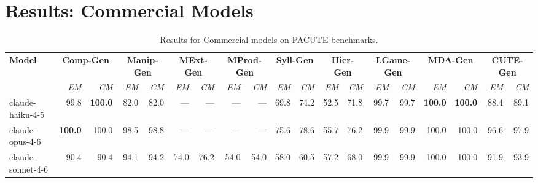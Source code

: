 \documentclass{article}
\begin{document}
\section*{Results: Commercial Models}

\begin{table}[htbp]
\centering
\caption{Results for Commercial models on PACUTE benchmarks.}
\label{tab:results-commercial}
\begin{threeparttable}
\begin{adjustbox}{max width=\textwidth}
\begin{tabular}{lrrrrrrrrrrrrrrrrrr}
\toprule
\textbf{Model} & \multicolumn{2}{c}{\textbf{Comp-Gen}} & \multicolumn{2}{c}{\textbf{Manip-Gen}} & \multicolumn{2}{c}{\textbf{MExt-Gen}} & \multicolumn{2}{c}{\textbf{MProd-Gen}} & \multicolumn{2}{c}{\textbf{Syll-Gen}} & \multicolumn{2}{c}{\textbf{Hier-Gen}} & \multicolumn{2}{c}{\textbf{LGame-Gen}} & \multicolumn{2}{c}{\textbf{MDA-Gen}} & \multicolumn{2}{c}{\textbf{CUTE-Gen}} \\
\cmidrule(lr){2-3}\cmidrule(lr){4-5}\cmidrule(lr){6-7}\cmidrule(lr){8-9}\cmidrule(lr){10-11}\cmidrule(lr){12-13}\cmidrule(lr){14-15}\cmidrule(lr){16-17}\cmidrule(lr){18-19}
 & \textit{EM} & \textit{CM} & \textit{EM} & \textit{CM} & \textit{EM} & \textit{CM} & \textit{EM} & \textit{CM} & \textit{EM} & \textit{CM} & \textit{EM} & \textit{CM} & \textit{EM} & \textit{CM} & \textit{EM} & \textit{CM} & \textit{EM} & \textit{CM} \\
\midrule
claude-haiku-4-5 & \cellcolor[HTML]{94C6DE}99.8 & \cellcolor[HTML]{92C5DE}\textbf{100.0} & \cellcolor[HTML]{FDF4F1}82.0 & \cellcolor[HTML]{FDF2ED}82.0 & — & — & — & — & \cellcolor[HTML]{CAE3EF}69.8 & \cellcolor[HTML]{B9DAEA}74.2 & \cellcolor[HTML]{FDF4F0}52.5 & \cellcolor[HTML]{C3DFEC}71.8 & \cellcolor[HTML]{9ECBE1}99.7 & \cellcolor[HTML]{9ECBE1}99.7 & \cellcolor[HTML]{92C5DE}\textbf{100.0} & \cellcolor[HTML]{92C5DE}\textbf{100.0} & \cellcolor[HTML]{BEDCEB}88.4 & \cellcolor[HTML]{EDF5F9}89.1 \\
claude-opus-4-6 & \cellcolor[HTML]{92C5DE}\textbf{100.0} & \cellcolor[HTML]{92C5DE}100.0 & \cellcolor[HTML]{9CCAE1}98.5 & \cellcolor[HTML]{9AC9E0}98.8 & — & — & — & — & \cellcolor[HTML]{B1D5E7}75.6 & \cellcolor[HTML]{A5CFE4}78.6 & \cellcolor[HTML]{EBF4F9}55.7 & \cellcolor[HTML]{9DCBE1}76.2 & \cellcolor[HTML]{96C7DF}99.9 & \cellcolor[HTML]{96C7DF}99.9 & \cellcolor[HTML]{92C5DE}100.0 & \cellcolor[HTML]{92C5DE}100.0 & \cellcolor[HTML]{9CCAE1}96.6 & \cellcolor[HTML]{9ECBE1}97.9 \\
claude-sonnet-4-6 & \cellcolor[HTML]{FEF7F4}90.4 & \cellcolor[HTML]{FEF7F4}90.4 & \cellcolor[HTML]{B9DAE9}94.1 & \cellcolor[HTML]{B9DAEA}94.2 & \cellcolor[HTML]{DDEDF4}74.0 & \cellcolor[HTML]{E5F1F7}76.2 & \cellcolor[HTML]{FBE1D5}54.0 & \cellcolor[HTML]{FBE1D5}54.0 & \cellcolor[HTML]{FDFEFE}58.0 & \cellcolor[HTML]{F8FBFC}60.5 & \cellcolor[HTML]{DCECF4}57.2 & \cellcolor[HTML]{E4F1F7}68.0 & \cellcolor[HTML]{96C7DF}99.9 & \cellcolor[HTML]{96C7DF}99.9 & \cellcolor[HTML]{92C5DE}100.0 & \cellcolor[HTML]{92C5DE}100.0 & \cellcolor[HTML]{AFD4E7}91.9 & \cellcolor[HTML]{C2DFEC}93.9 \\

\end{tabular}
\end{adjustbox}
\end{threeparttable}
\end{table}
\end{document}
